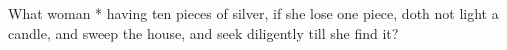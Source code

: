 What woman * having ten pieces of silver, if she lose one piece, doth not light a candle, and sweep the house, and seek diligently till she find it?